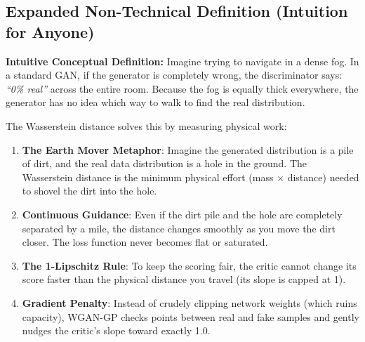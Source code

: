 \documentclass[11pt,a4paper]{article}
\theoremstyle{definition}
\begin{document}
\subsection{Expanded Non-Technical Definition (Intuition for Anyone)}
\textbf{Intuitive Conceptual Definition:}
Imagine trying to navigate in a dense fog. In a standard GAN, if the generator is completely wrong, the discriminator says: \emph{``0\% real''} across the entire room. Because the fog is equally thick everywhere, the generator has no idea which way to walk to find the real distribution.

The Wasserstein distance solves this by measuring physical work:
\begin{enumerate}
    \item \textbf{The Earth Mover Metaphor}: Imagine the generated distribution is a pile of dirt, and the real data distribution is a hole in the ground. The Wasserstein distance is the minimum physical effort (mass $\times$ distance) needed to shovel the dirt into the hole.
    \item \textbf{Continuous Guidance}: Even if the dirt pile and the hole are completely separated by a mile, the distance changes smoothly as you move the dirt closer. The loss function never becomes flat or saturated.
    \item \textbf{The 1-Lipschitz Rule}: To keep the scoring fair, the critic cannot change its score faster than the physical distance you travel (its slope is capped at 1).
    \item \textbf{Gradient Penalty}: Instead of crudely clipping network weights (which ruins capacity), WGAN-GP checks points between real and fake samples and gently nudges the critic's slope toward exactly 1.0.
\end{enumerate}
\end{document}
